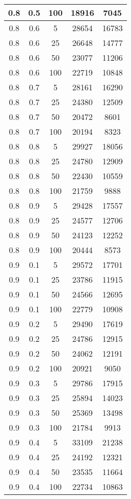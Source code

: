 \begin{appendices}
\begin{longtable}[c]{|c|c|c|c|c|}
	0.8& 0.5& 100& 18916&  7045\\
	\hline
	0.8& 0.6& 5& 28654&  16783\\
	\hline
	0.8& 0.6& 25& 26648&  14777\\
	\hline
	0.8& 0.6& 50& 23077&  11206\\
	\hline
	0.8& 0.6& 100& 22719&  10848\\
	\hline
	0.8& 0.7& 5& 28161&  16290\\
	\hline
	0.8& 0.7& 25& 24380&  12509\\
	\hline
	0.8& 0.7& 50& 20472&  8601\\
	\hline
	0.8& 0.7& 100& 20194&  8323\\
	\hline
	0.8& 0.8& 5& 29927&  18056\\
	\hline
	0.8& 0.8& 25& 24780&  12909\\
	\hline
	0.8& 0.8& 50& 22430&  10559\\
	\hline
	0.8& 0.8& 100& 21759&  9888\\
	\hline
	0.8& 0.9& 5& 29428&  17557\\
	\hline
	0.8& 0.9& 25& 24577&  12706\\
	\hline
	0.8& 0.9& 50& 24123&  12252\\
	\hline
	0.8& 0.9& 100& 20444&  8573\\
	\hline
	0.9& 0.1& 5& 29572&  17701\\
	\hline
	0.9& 0.1& 25& 23786&  11915\\
	\hline
	0.9& 0.1& 50& 24566&  12695\\
	\hline
	0.9& 0.1& 100& 22779&  10908\\
	\hline
	0.9& 0.2& 5& 29490&  17619\\
	\hline
	0.9& 0.2& 25& 24786&  12915\\
	\hline
	0.9& 0.2& 50& 24062&  12191\\
	\hline
	0.9& 0.2& 100& 20921&  9050\\
	\hline
	0.9& 0.3& 5& 29786&  17915\\
	\hline
	0.9& 0.3& 25& 25894&  14023\\
	\hline
	0.9& 0.3& 50& 25369&  13498\\
	\hline
	0.9& 0.3& 100& 21784&  9913\\
	\hline
	0.9& 0.4& 5& 33109&  21238\\
	\hline
	0.9& 0.4& 25& 24192&  12321\\
	\hline
	0.9& 0.4& 50& 23535&  11664\\
	\hline
	0.9& 0.4& 100& 22734&  10863\\
	\hline

\end{longtable}
\end{appendices}
